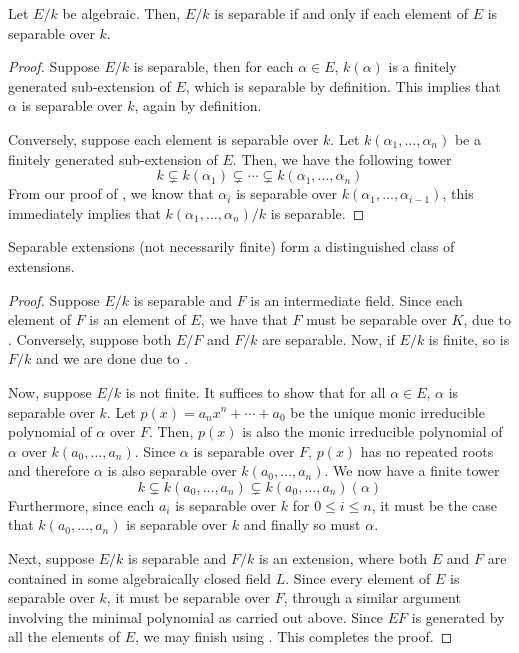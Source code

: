 \begin{theorem}
    Let $E/k$ be algebraic. Then, $E/k$ is separable if and only if each element of $E$ is separable over $k$.
\end{theorem}
\begin{proof}
    Suppose $E/k$ is separable, then for each $\alpha\in E$, $k(\alpha)$ is a finitely generated sub-extension of $E$, which is separable by definition. This implies that $\alpha$ is separable over $k$, again by definition.

    Conversely, suppose each element is separable over $k$. Let $k(\alpha_1,\ldots,\alpha_n)$ be a finitely generated sub-extension of $E$. Then, we have the following tower 
    \begin{equation*}
        k\subsetneq k(\alpha_1)\subsetneq\cdots\subsetneq k(\alpha_1,\ldots,\alpha_n)
    \end{equation*}
    From our proof of , we know that $\alpha_i$ is separable over $k(\alpha_1,\ldots,\alpha_{i-1})$, this immediately implies that $k(\alpha_1,\ldots,\alpha_n)/k$ is separable.
\end{proof}

\begin{theorem}
    Separable extensions (not necessarily finite) form a distinguished class of extensions.
\end{theorem}
\begin{proof}
    Suppose $E/k$ is separable and $F$ is an intermediate field. Since each element of $F$ is an element of $E$, we have that $F$ must be separable over $K$, due to . Conversely, suppose both $E/F$ and $F/k$ are separable. Now, if $E/k$ is finite, so is $F/k$ and we are done due to .

    Now, suppose $E/k$ is not finite. It suffices to show that for all $\alpha\in E$, $\alpha$ is separable over $k$. Let $p(x) = a_nx^n + \cdots + a_0$ be the unique monic irreducible polynomial of $\alpha$ over $F$. Then, $p(x)$ is also the monic irreducible polynomial of $\alpha$ over $k(a_0,\ldots,a_n)$. Since $\alpha$ is separable over $F$, $p(x)$ has no repeated roots and therefore $\alpha$ is also separable over $k(a_0,\ldots,a_n)$. We now have a finite tower 
    \begin{equation*}
        k\subsetneq k(a_0,\ldots,a_n)\subsetneq k(a_0,\ldots,a_n)(\alpha)
    \end{equation*}
    Furthermore, since each $a_i$ is separable over $k$ for $0\le i\le n$, it must be the case that $k(a_0,\ldots,a_n)$ is separable over $k$ and finally so must $\alpha$.

    Next, suppose $E/k$ is separable and $F/k$ is an extension, where both $E$ and $F$ are contained in some algebraically closed field $L$. Since every element of $E$ is separable over $k$, it must be separable over $F$, through a similar argument involving the minimal polynomial as carried out above. Since $EF$ is generated by all the elements of $E$, we may finish using . This completes the proof.
\end{proof}

